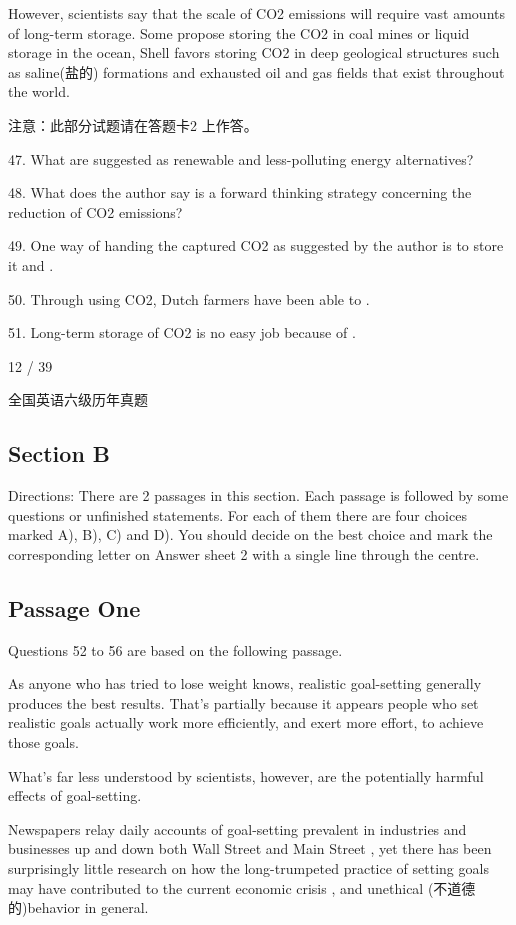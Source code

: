 \documentclass[UTF8,11pt]{ctexart}
\begin{document}
However, scientists say that the scale of CO2 emissions will require vast amounts of long-term storage. Some propose storing the CO2 in coal mines or liquid storage in the ocean, Shell favors storing CO2 in deep geological structures such as saline(盐的) formations and exhausted oil and gas fields that exist throughout the world.


注意：此部分试题请在答题卡2 上作答。


47. What are suggested as renewable and less-polluting energy alternatives?


48. What does the author say is a forward thinking strategy concerning the reduction of CO2 emissions?


49. One way of handing the captured CO2 as suggested by the author is to store it and .


50. Through using CO2, Dutch farmers have been able to .


51. Long-term storage of CO2 is no easy job because of .


12 / 39


全国英语六级历年真题


\subsection*{\textbf{Section B}}


Directions: There are 2 passages in this section. Each passage is followed by some questions or unfinished statements. For each of them there are four choices marked A), B), C) and D). You should decide on the best choice and mark the corresponding letter on Answer sheet 2 with a single line through the centre.


\subsection*{\textbf{Passage One}}


Questions 52 to 56 are based on the following passage.


As anyone who has tried to lose weight knows, realistic goal-setting generally produces the best results. That's partially because it appears people who set realistic goals actually work more efficiently, and exert more effort, to achieve those goals.


What's far less understood by scientists, however, are the potentially harmful effects of goal-setting.


Newspapers relay daily accounts of goal-setting prevalent in industries and businesses up and down both Wall Street and Main Street , yet there has been surprisingly little research on how the long-trumpeted practice of setting goals may have contributed to the current economic crisis , and unethical (不道德的)behavior in general.
\end{document}
